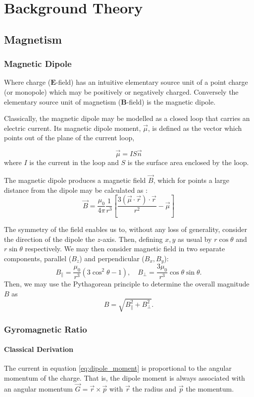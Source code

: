 \chapter{Background Theory}
\section{Magnetism}
\subsection{Magnetic Dipole}
Where charge ($\mathbf{E}$-field) has an intuitive elementary source unit of a point charge (or monopole) which may be positively or negatively charged. Conversely the elementary source unit of magnetism ($\mathbf{B}$-field) is the magnetic dipole. 

Classically, the magnetic dipole may be modelled as a closed loop that carries an
electric current. 
Its magnetic dipole moment, $\vec{\mu}$, is defined as the vector which points out of the plane
of the current loop, 

\begin{equation}
    \vec{\mu} = IS \vec{n}
    \label{eq:dipole_moment}
\end{equation}
where $I$ is the current in the loop and $S$ is the surface area enclosed by the loop. 

The magnetic dipole produces a magnetic field $\vec{B}$, which for points a large distance from the dipole may be calculated as :
$$\vec{B} = \frac{\mu_0}{4\pi} \frac{1}{r^3} \left[\frac{3(\vec{\mu} \cdot \vec{r}) \cdot \vec{r}}{r^2} - \vec{\mu}\right]$$

The symmetry of the field enables us to, without any loss of generality, consider the direction of the dipole the $z$-axis. Then, defining $x,y$ as usual by $r \cos\theta$ and $r \sin\theta$ respectively. We may then consider magnetic field in two separate components, parallel ($B_z$) and perpendicular ($B_x, B_y$): 
$$B_\parallel =\frac{\mu_0}{r^3}(3\cos^2 \theta - 1), \quad B_\perp = \frac{3\mu_0}{r^3}\cos\theta\sin\theta.$$
Then, we may use the Pythagorean principle to determine the overall magnitude $B$ as
$$B = \sqrt{B_\parallel^2 + B_\perp^2}.$$

\subsection{Gyromagnetic Ratio}
\subsubsection{Classical Derivation}
The current in equation \ref{eq:dipole_moment} is proportional to the angular momentum of the charge. That is, the dipole moment is always associated with an angular momentum $\vec{G} = \vec{r} \times \vec{p}$ with $\vec{r}$ the radius and $\vec{p}$ the momentum. 

